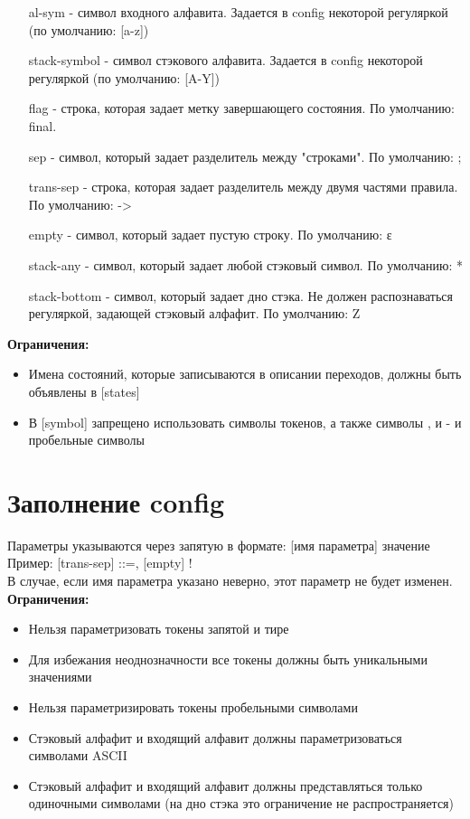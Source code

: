 \documentclass{article}
\begin{document}
\begin{itemize}
\item [al-sym] - символ входного алфавита. Задается в config некоторой регуляркой (по умолчанию: [a-z])
\item [stack-symbol] - символ стэкового алфавита. Задается в config некоторой регуляркой (по умолчанию: [A-Y])
\item [flag] - строка, которая задает метку завершающего состояния. По умолчанию: final.
\item [sep] - символ, который задает разделитель между "строками". По умолчанию: ;
\item [trans-sep] - строка, которая задает разделитель между двумя частями правила. По умолчанию: ->
\item [empty] - символ, который задает пустую строку. По умолчанию: ɛ
\item [stack-any] - символ, который задает любой стэковый символ. По умолчанию: *
\item [stack-bottom] - символ, который задает дно стэка. Не должен распознаваться регуляркой, задающей стэковый алфафит. По умолчанию: Z

\end{itemize}

\newline
\textbf{Ограничения:}

\begin{itemize}
\item Имена состояний, которые записываются в описании переходов, должны быть объявлены в [states]
\item В [symbol] запрещено использовать символы токенов, а также символы , и - и пробельные символы
\end{itemize}

\section{Заполнение config}
Параметры указываются через запятую в формате: [имя параметра] значение \\

Пример: [trans-sep] ::=, [empty] ! \\

В случае, если имя параметра указано неверно, этот параметр не будет изменен. \\

\textbf{Ограничения:}

\begin{itemize}

\item Нельзя параметризовать токены запятой и тире
\item Для избежания неоднозначности все токены должны быть уникальными значениями
\item Нельзя параметризировать токены пробельными символами
\item Стэковый алфафит и входящий алфавит должны параметризоваться символами ASCII
\item Стэковый алфафит и входящий алфавит должны представляться только одиночными символами (на дно стэка это ограничение не распространяется)
\end{itemize}
\end{document}
